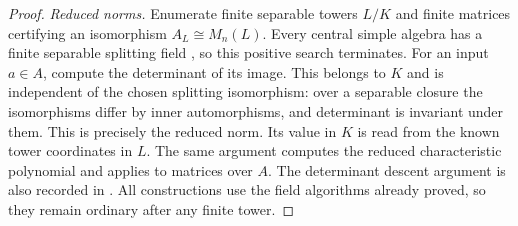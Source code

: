 \begin{proof}
\emph{Reduced norms.}
Enumerate finite separable towers $L/K$ and finite matrices
certifying an isomorphism $A_L\cong M_n(L)$.
Every central simple algebra has a finite separable
splitting field
\cite[Proposition 11.8.5]{C-StacksGlobalFunctionArithmetic},
so this positive search terminates. For an input $a\in A$,
compute the determinant of its image. This belongs to $K$
and is independent of the chosen splitting isomorphism:
over a separable closure the isomorphisms differ by inner
automorphisms, and determinant is invariant under them.
This is precisely the reduced norm. Its value in $K$ is
read from the known tower coordinates in $L$.
The same argument computes the reduced characteristic
polynomial and applies to matrices over $A$.
The determinant descent argument is also recorded in
\cite[proof of Theorem 59.67.8]{C-StacksGlobalFunctionArithmetic}.
All constructions use the field algorithms already proved,
so they remain ordinary after any finite tower.
\end{proof}

